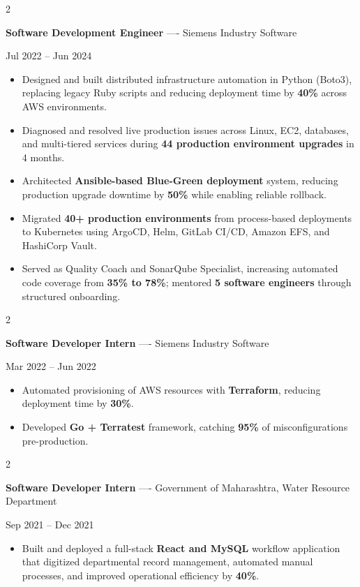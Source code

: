 \documentclass[10pt, letterpaper]{article}
\newenvironment{highlights}{
    \begin{itemize}[
        topsep=0.10 cm,
        parsep=0.06 cm,
        partopsep=0pt,
        itemsep=0.06 cm,
        leftmargin=12pt
    ]
}{
    \end{itemize}
}
\newenvironment{twocolentry}[2][]{
    \onecolentry
    \def\secondColumn{#2}
    \setcolumnwidth{\fill, 4.5 cm}
    \begin{paracol}{2}
}{
    \switchcolumn \raggedleft \secondColumn
    \end{paracol}
    \endonecolentry
}
\begin{document}
\vspace{0.15 cm}

\begin{twocolentry}{Jul 2022 -- Jun 2024}
\textbf{Software Development Engineer} ---- Siemens Industry Software
\end{twocolentry}
\begin{highlights}
  \item Designed and built distributed infrastructure automation in Python (Boto3), replacing legacy Ruby scripts and reducing deployment time by \textbf{40\%} across AWS environments.
  \item Diagnosed and resolved live production issues across Linux, EC2, databases, and multi-tiered services during \textbf{44 production environment upgrades} in 4 months.
  \item Architected \textbf{Ansible-based Blue-Green deployment} system, reducing production upgrade downtime by \textbf{50\%} while enabling reliable rollback.
  \item Migrated \textbf{40+ production environments} from process-based deployments to Kubernetes using ArgoCD, Helm, GitLab CI/CD, Amazon EFS, and HashiCorp Vault.
  \item Served as Quality Coach and SonarQube Specialist, increasing automated code coverage from \textbf{35\% to 78\%}; mentored \textbf{5 software engineers} through structured onboarding.
\end{highlights}

\vspace{0.15 cm}

\begin{twocolentry}{Mar 2022 -- Jun 2022}
\textbf{Software Developer Intern} ---- Siemens Industry Software
\end{twocolentry}
\begin{highlights}
  \item Automated provisioning of AWS resources with \textbf{Terraform}, reducing deployment time by \textbf{30\%}.
  \item Developed \textbf{Go + Terratest} framework, catching \textbf{95\%} of misconfigurations pre-production.
\end{highlights}

\vspace{0.15 cm}

\begin{twocolentry}{Sep 2021 -- Dec 2021}
\textbf{Software Developer Intern} ---- Government of Maharashtra, Water Resource Department
\end{twocolentry}
\begin{highlights}
  \item Built and deployed a full-stack \textbf{React and MySQL} workflow application that digitized departmental record management, automated manual processes, and improved operational efficiency by \textbf{40\%}.
\end{highlights}
\end{document}
